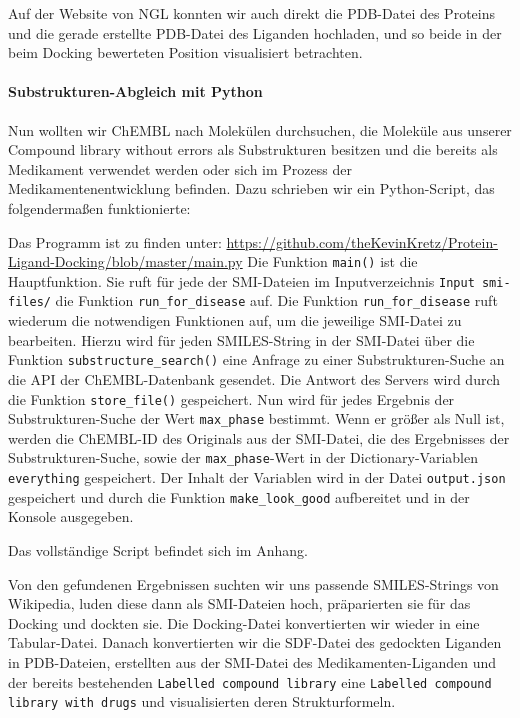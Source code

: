 \documentclass[10pt]{article}
\begin{document}
    Auf der Website von NGL konnten wir auch direkt die PDB-Datei des Proteins und die gerade erstellte PDB-Datei des
    Liganden hochladen, und so beide in der beim Docking bewerteten Position visualisiert betrachten.

    \paragraph{Substrukturen-Abgleich mit Python}
    Nun wollten wir ChEMBL nach Molekülen durchsuchen, die Moleküle aus unserer Compound library without errors
    als Substrukturen besitzen und die bereits als Medikament verwendet werden oder sich im Prozess der
    Medikamentenentwicklung befinden. Dazu schrieben wir ein Python-Script, das folgendermaßen funktionierte:

    Das Programm ist zu finden unter: \url{https://github.com/theKevinKretz/Protein-Ligand-Docking/blob/master/main.py}
    Die Funktion \texttt{main()} ist die Hauptfunktion.
    Sie ruft für jede der SMI-Dateien im Inputverzeichnis \texttt{Input smi-files/} die Funktion
    \texttt{run\_for\_disease} auf.
    Die Funktion \texttt{run\_for\_disease} ruft wiederum die notwendigen Funktionen auf, um die jeweilige SMI-Datei
    zu bearbeiten.
    Hierzu wird für jeden SMILES-String in der SMI-Datei über die Funktion \texttt{substructure\_search()} eine
    Anfrage zu einer Substrukturen-Suche an die API der ChEMBL-Datenbank gesendet.
    Die Antwort des Servers wird durch die Funktion \texttt{store\_file()} gespeichert.
    Nun wird für jedes Ergebnis der Substrukturen-Suche der Wert \texttt{max\_phase} bestimmt.
    Wenn er größer als Null ist, werden die ChEMBL-ID des Originals aus der SMI-Datei, die des Ergebnisses der
    Substrukturen-Suche, sowie der \texttt{max\_phase}-Wert in der Dictionary-Variablen \texttt{everything} gespeichert.
    Der Inhalt der Variablen wird in der Datei \texttt{output.json} gespeichert und durch die Funktion
    \texttt{make\_look\_good} aufbereitet und in der Konsole ausgegeben.

    Das vollständige Script befindet sich im Anhang.


    Von den gefundenen Ergebnissen suchten wir uns passende SMILES-Strings von Wikipedia, luden diese dann als
    SMI-Dateien hoch, präparierten sie für das Docking und dockten sie. Die Docking-Datei konvertierten wir wieder in
    eine Tabular-Datei. Danach konvertierten wir die SDF-Datei des gedockten Liganden in PDB-Dateien, erstellten aus
    der SMI-Datei des Medikamenten-Liganden und der bereits bestehenden \texttt{Labelled compound library} eine
    \texttt{Labelled compound library with drugs} und visualisierten deren Strukturformeln.
\end{document}
